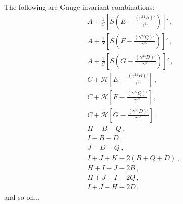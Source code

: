 \documentclass{article}
\newcommand*\scr[1]{\mathscr{#1}}
\newcommand*\p[1]{\left(#1\right)}
\newcommand*\ps[1]{\left[#1\right]}
\newcommand*\f[2]{\frac{#1}{#2}}
\begin{document}
The following are Gauge invariant combinations:
\begin{align}
&A+\f1S\ps{S\p{E-\f{(\gamma^{11} B)'}{\gamma^{11}}}}'\,,\\
&A+\f1S\ps{S\p{F-\f{(\gamma^{22} Q)'}{\gamma^{22}}}}'\,,\\
&A+\f1S\ps{S\p{G-\f{(\gamma^{33} D)'}{\gamma^{33}}}}'\,,\\
&C+\scr H\ps{E-\f{(\gamma^{11}B)'}{\gamma^{11}}}\,,\\
&C+\scr H\ps{F-\f{(\gamma^{22}Q)'}{\gamma^{22}}}\,,\\
&C+\scr H\ps{G-\f{(\gamma^{33}D)'}{\gamma^{33}}}\,,\\
&H-B-Q\,,\\
&I-B-D\,,\\
&J-D-Q\,,\\
&I+J+K-2(B+Q+D)\,,\\
&H+I-J-2B\,,\\
&H+J-I-2Q\,,\\
&I+J-H-2D\,,
\end{align}
and so on...
\\\\
\end{document}
